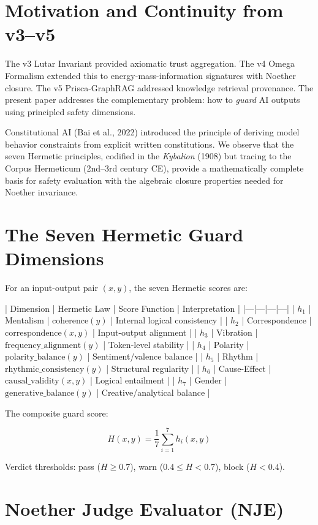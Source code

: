\documentclass[11pt]{article}
\theoremstyle{plain}
\begin{document}
\section{Motivation and Continuity from v3–v5}

The v3 Lutar Invariant provided axiomatic trust aggregation. The v4 Omega Formalism extended this to energy-mass-information signatures with Noether closure. The v5 Prisca-GraphRAG addressed knowledge retrieval provenance. The present paper addresses the complementary problem: how to \emph{guard} AI outputs using principled safety dimensions.

Constitutional AI (Bai et al., 2022) introduced the principle of deriving model behavior constraints from explicit written constitutions. We observe that the seven Hermetic principles, codified in the \emph{Kybalion} (1908) but tracing to the Corpus Hermeticum (2nd–3rd century CE), provide a mathematically complete basis for safety evaluation with the algebraic closure properties needed for Noether invariance.


\section{The Seven Hermetic Guard Dimensions}

For an input-output pair \( (x, y) \), the seven Hermetic scores are:

| Dimension | Hermetic Law | Score Function | Interpretation |
|—|—|—|—|
| \( h_1 \) | Mentalism | \( \text{coherence}(y) \) | Internal logical consistency |
| \( h_2 \) | Correspondence | \( \text{correspondence}(x, y) \) | Input-output alignment |
| \( h_3 \) | Vibration | \( \text{frequency\_alignment}(y) \) | Token-level stability |
| \( h_4 \) | Polarity | \( \text{polarity\_balance}(y) \) | Sentiment/valence balance |
| \( h_5 \) | Rhythm | \( \text{rhythmic\_consistency}(y) \) | Structural regularity |
| \( h_6 \) | Cause-Effect | \( \text{causal\_validity}(x, y) \) | Logical entailment |
| \( h_7 \) | Gender | \( \text{generative\_balance}(y) \) | Creative/analytical balance |

The composite guard score:

\begin{equation}
H(x,y) = \frac{1}{7} \sum_{i=1}^{7} h_i(x,y)
\end{equation}

Verdict thresholds: pass (\( H \geq 0.7 \)), warn (\( 0.4 \leq H < 0.7 \)), block (\( H < 0.4 \)).


\section{Noether Judge Evaluator (NJE)}
\end{document}
